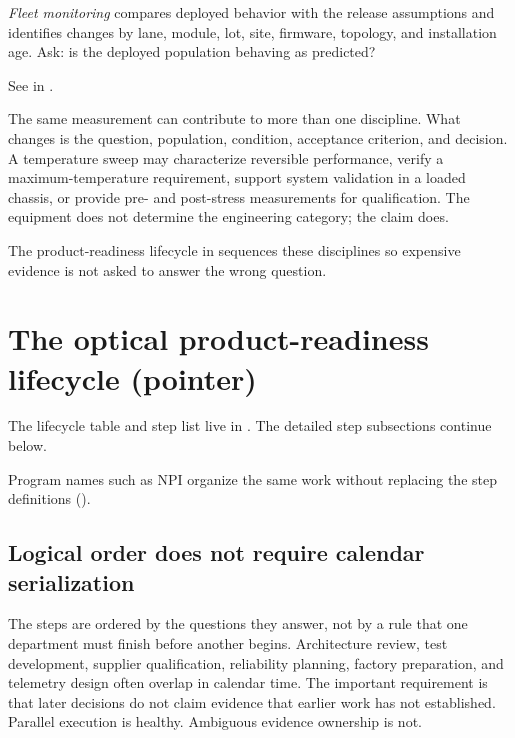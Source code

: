 \emph{Fleet monitoring} compares deployed behavior with the release assumptions
and identifies changes by lane, module, lot, site, firmware, topology, and
installation age. Ask: is the deployed population behaving as predicted?

See  in .



The same measurement can contribute to more than one discipline. What changes
is the question, population, condition, acceptance criterion, and decision. A
temperature sweep may characterize reversible performance, verify a
maximum-temperature requirement, support system validation in a loaded chassis,
or provide pre- and post-stress measurements for qualification. The equipment
does not determine the engineering category; the claim does.

The product-readiness lifecycle in  sequences these
disciplines so expensive evidence is not asked to answer the wrong question.

\section{The optical product-readiness lifecycle (pointer)}
The lifecycle table and step list live in .
The detailed step subsections continue below.



Program names such as
NPI
organize the same work without replacing the step definitions
().

\subsection{Logical order does not require calendar serialization}

The steps are ordered by the questions they answer, not by a rule that one
department must finish before another begins. Architecture review, test
development, supplier qualification, reliability planning, factory preparation,
and telemetry design often overlap in calendar time. The important requirement
is that later decisions do not claim evidence that earlier work has not
established. Parallel execution is healthy. Ambiguous evidence ownership is not.

